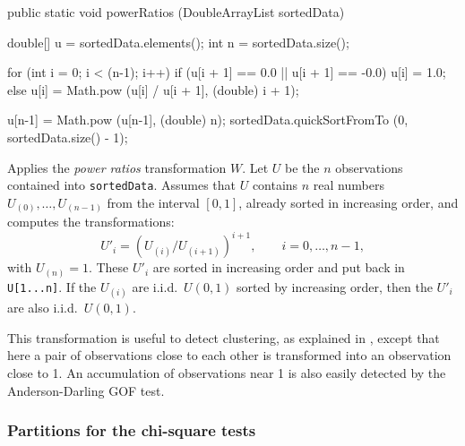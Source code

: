 \begin{code}

   public static void powerRatios (DoubleArrayList sortedData)\begin{hide} {

      double[] u = sortedData.elements();
      int n = sortedData.size();

      for (int i = 0; i < (n-1); i++) {
         if (u[i + 1] == 0.0 || u[i + 1] == -0.0)
            u[i] = 1.0;
         else
            u[i] = Math.pow (u[i] / u[i + 1], (double) i + 1);
      }

      u[n-1] = Math.pow (u[n-1], (double) n);
      sortedData.quickSortFromTo (0, sortedData.size() - 1);
   }\end{hide}
\end{code}
 \begin{tabb}  Applies the {\em power ratios\/} transformation $W$.
   Let $U$ be the $n$ observations contained into \texttt{sortedData}.
   Assumes that $U$ contains $n$ real numbers
   $U_{(0)},\dots,U_{(n-1)}$ from the interval $[0,1]$,
   already sorted in increasing order, and computes the transformations:
     $$ U'_i = (U_{(i)} / U_{(i+1)})^{i+1}, \qquad  i=0,\dots,n-1,$$
   with $U_{(n)} = 1$.
   These $U'_i$ are sorted in increasing order and put back in
   \texttt{U[1...n]}.
   If the $U_{(i)}$ are i.i.d.\ $U (0,1)$ sorted by increasing order,
   then the $U'_i$ are also i.i.d.\ $U (0,1)$.

  This transformation is useful to detect clustering, as explained in
  ,
   except that here a pair of
  observations close to each other is transformed
  into an observation close to 1.
  An accumulation of observations near 1 is also easily detected by
  the Anderson-Darling GOF test.
 \end{tabb}
\begin{htmlonly}
\end{htmlonly}


\subsubsection*{Partitions for the chi-square tests}

